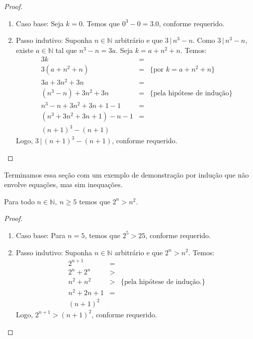 \begin{proof}
\verb| |\\
\begin{enumerate}
  \item[\ ]Caso base: Seja $k = 0$. Temos que $0^3 - 0 = 3.0$, conforme requerido.
  \item[\ ]Passo indutivo: Suponha $n\in\mathbb{N}$ arbitrário e que
    $3\,|\,n^3 - n$. Como $3\,|\,n^3 - n$, existe $a\in\mathbb{N}$ tal
    que $n^3 - n = 3a$. Seja $k = a + n^2 + n$. Temos:
    \[
 \begin{array}{lcl}
   3k & = & \\
   3 (a + n^2 + n) & = & \{\text{por }k = a + n^2 + n\}\\
   3a + 3n^2 + 3n & = & \\
   (n^3 - n) + 3n^2 + 3n & = &\{\text{pela hipótese de indução}\}\\
   n^3 -n + 3n^2 + 3n + 1 - 1 & = & \\
   (n^3 + 3n^2 + 3n + 1) - n -1 & = & \\
   (n + 1)^3 - (n +1)
 \end{array}
    \]
    Logo, $3\,|\,(n+1)^3-(n+1)$, conforme requerido.
\end{enumerate}
\end{proof}
Terminamos essa seção com um exemplo de demonstração por indução que
não envolve equações, mas sim inequações.
\begin{Theorem}
Para todo $n\in\mathbb{N},\:n\geq 5$ temos que $2^n > n^2$.
\end{Theorem}
\begin{proof}
\verb| |\\
\begin{enumerate}
  \item[\ ]Caso base: Para $n = 5$, temos que $2^5 > 25$, conforme
    requerido.
  \item[\ ]Passo indutivo: Suponha $n\in\mathbb{N}$ arbitrário e que
    $2^n > n^2$. Temos:
   \[
\begin{array}{lcl}
    2^{n+1} & = &\\
    2^n + 2^n & > &\\
   n^2 + n^2  & > &\{\text{pela hipótese de indução.}\}\\
   n^2 + 2n + 1 & = &\\
   (n+ 1)^2
\end{array}
  \]
  Logo, $2^{n+1} > (n + 1)^2$, conforme requerido.
\end{enumerate}
\end{proof}
